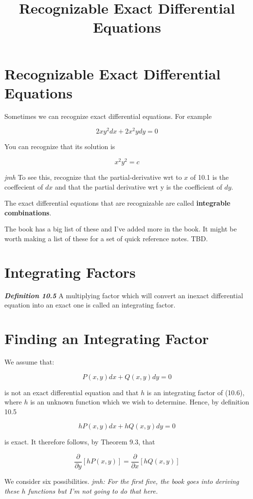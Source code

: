 \documentclass{article}
\title{Recognizable Exact Differential Equations}
\begin{document}
\section{Recognizable Exact Differential Equations}

Sometimes we can recognize exact differential equations. For example

\[ \tag{10.1} 2xy^2dx+2x^2ydy = 0 \]

You can recognize that its solution is

\[ \tag{10.11} x^2y^2 = c \]

\emph{jmh} To see this, recognize that the \@{partial-derivative} wrt to $x$ of 10.1 is the coeffecient of $dx$ and that the partial derivative wrt y is the coefficient of $dy$.

The exact differential equations that are recognizable are called \textbf{integrable combinations}.

The book has a big list of these and I've added more in the book. It might be worth making a list of these for a set of quick reference notes. TBD.

\section{Integrating Factors}
\emph{\textbf{Definition 10.5}}
A multiplying factor which will convert an inexact differential equation into an exact one is called an integrating factor.

\section{Finding an Integrating Factor}

We assume that:

\[ \tag{10.6} P(x,y)dx + Q(x,y)dy = 0 \]

is not an exact differential equation and that $h$ is an integrating factor of (10.6), where $h$ is an unknown function which we wish to determine. Hence, by definition 10.5

\[ \tag{10.61} hP(x,y)dx + hQ(x,y)dy = 0 \]

is exact. It therefore follows, by Theorem 9.3, that

\[ \tag{10.62} \frac{\partial}{\partial y}[hP(x,y)] = \frac{\partial}{\partial x}[hQ(x,y)] \]

We consider six possibilities. \emph{jmh: For the first five, the book goes into deriving these $h$ functions but I'm not going to do that here.}
\end{document}
